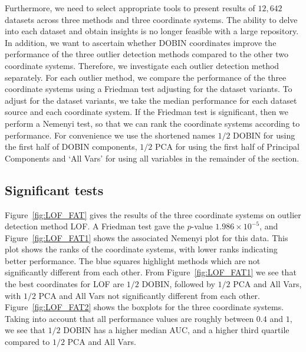 \documentclass[a4paper,11pt]{article}
\begin{document}
Furthermore, we need to select appropriate tools to present results of $12,642$ datasets across three methods and three coordinate systems. The ability to delve into each dataset and obtain insights is no longer feasible with a large repository. In addition, we want to ascertain whether DOBIN coordinates improve the performance of the three outlier detection methods compared to the other two coordinate systems. Therefore, we investigate each outlier detection method separately. For each outlier method, we compare the performance of the three coordinate systems using a Friedman test adjusting for the dataset variants. To adjust for the dataset variants, we take the median performance for each dataset source and each coordinate system. If the Friedman test is significant, then we perform a Nemenyi test, so that we can rank the coordinate systems according to performance. For convenience we use the shortened names $1/2$ DOBIN for using the first half of DOBIN components, $1/2$ PCA for using the first half of Principal Components and `All Vars' for using all variables in the remainder of the section.

\subsection{Significant tests}\label{sec:DatRepo1}


Figure~\ref{fig:LOF_FAT} gives the results of the three coordinate systems on outlier detection method LOF. A Friedman test gave the $p$-value $1.986 \times 10^{-5}$, and Figure~\ref{fig:LOF_FAT1} shows the associated Nemenyi plot for this data. This plot shows the ranks of the coordinate systems, with lower ranks indicating better performance. The blue squares highlight methods which are not significantly different from each other. From Figure~\ref{fig:LOF_FAT1} we see that the best coordinates for LOF are $1/2$ DOBIN, followed by $1/2$ PCA and All Vars, with $1/2$ PCA and All Vars not significantly different from each other.
Figure~\ref{fig:LOF_FAT2} shows the boxplots for the three coordinate systems. Taking into account that all performance values are roughly between $0.4$ and $1$,  we see that $1/2$ DOBIN has a higher median AUC, and a higher third quartile compared to $1/2$ PCA and All Vars. 
\end{document}
